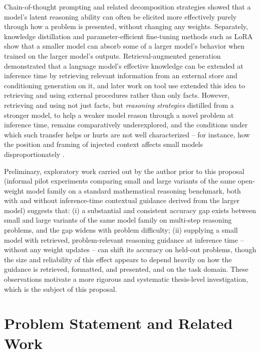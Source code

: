 \documentclass[a4, 12pt]{article}
\begin{document}
Chain-of-thought prompting \cite{wei2022chain} and related decomposition strategies \cite{zhou2023leasttomost} showed that a model's latent reasoning ability can often be elicited more effectively purely through how a problem is presented, without changing any weights. Separately, knowledge distillation \cite{hinton2015distilling} and parameter-efficient fine-tuning methods such as LoRA \cite{hu2021lora} show that a smaller model can absorb some of a larger model's behavior when trained on the larger model's outputs. Retrieval-augmented generation \cite{lewis2020retrieval} demonstrated that a language model's effective knowledge can be extended at inference time by retrieving relevant information from an external store and conditioning generation on it, and later work on tool use \cite{schick2023toolformer} extended this idea to retrieving and using external procedures rather than only facts. However, retrieving and using not just facts, but \emph{reasoning strategies} distilled from a stronger model, to help a weaker model reason through a novel problem at inference time, remains comparatively underexplored, and the conditions under which such transfer helps or hurts are not well characterized -- for instance, how the position and framing of injected context affects small models disproportionately \cite{liu2023lost}.

Preliminary, exploratory work carried out by the author prior to this proposal (informal pilot experiments comparing small and large variants of the same open-weight model family on a standard mathematical reasoning benchmark, both with and without inference-time contextual guidance derived from the larger model) suggests that: (i) a substantial and consistent accuracy gap exists between small and large variants of the same model family on multi-step reasoning problems, and the gap widens with problem difficulty; (ii) supplying a small model with retrieved, problem-relevant reasoning guidance at inference time -- without any weight updates -- can shift its accuracy on held-out problems, though the size and reliability of this effect appears to depend heavily on how the guidance is retrieved, formatted, and presented, and on the task domain. These observations motivate a more rigorous and systematic thesis-level investigation, which is the subject of this proposal.

\section{Problem Statement and Related Work}
\end{document}
